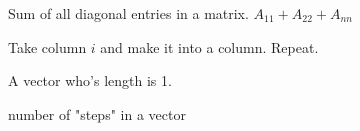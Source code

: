 \begin{definition}[Trace]
    Sum of all diagonal entries in a matrix.
    $A_{11} + A_{22} + A_{nn}$
\end{definition}

\begin{definition}[Transpose]
    Take column $i$ and make it into a column. Repeat.
\end{definition}

\begin{definition}
    A vector who's length is 1.
\end{definition}


\begin{definition}
    number of "steps" in a vector
\end{definition}

